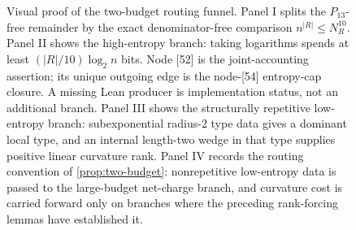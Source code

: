 \documentclass[11pt]{article}
\begin{document}
\begin{figure}[t]
{%
}
\caption[Visual proof of the two-budget routing funnel]{Visual proof of the two-budget routing funnel.  Panel I splits the \(P_{13}\)-free remainder by the exact denominator-free comparison \(n^{|R|}\le N_R^{10}\).  Panel II shows the high-entropy branch: taking logarithms spends at least \((|R|/10)\log_2 n\) bits.  Node [52] is the joint-accounting assertion; its unique outgoing edge is the node-[54] entropy-cap closure.  A missing Lean producer is implementation status, not an additional branch.  Panel III shows the structurally repetitive low-entropy branch: subexponential radius-\(2\) type data gives a dominant local type, and an internal length-two wedge in that type supplies positive linear curvature rank.  Panel IV records the routing convention of \cref{prop:two-budget}: nonrepetitive low-entropy data is passed to the large-budget net-charge branch, and curvature cost is carried forward only on branches where the preceding rank-forcing lemmas have established it.}
\label{fig:two-budget-routing-funnel}
\end{figure}
\end{document}
